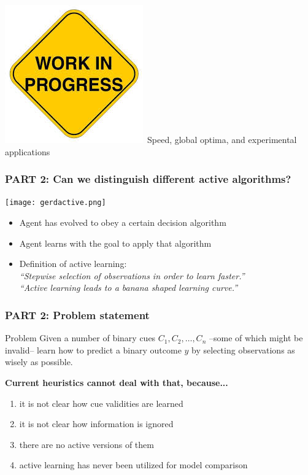 \documentclass{beamer}
\begin{document}
\begin{frame}
 \includegraphics[scale=0.12]{workinprogress.jpeg}~Speed, global optima, and experimental applications
\end{frame}


\begin{frame}
 \frametitle{PART 2: Can we distinguish different active algorithms?}
\vspace{-1cm}
\begin{center}
\texttt{[image: gerdactive.png]}
\end{center}
\begin{itemize}
\vspace{-0.5cm}
\item Agent has evolved to obey a certain decision algorithm
\item Agent learns with the goal to apply that algorithm 
\item Definition of active learning:\medskip\\
\emph{``Stepwise selection of observations in order to learn faster.''}\medskip\\
\emph{``Active learning leads to a banana shaped learning curve.''}
\end{itemize}
\end{frame}


\begin{frame}
 \frametitle{PART 2: Problem statement}
\begin{block}{Problem}
Given a number of binary cues $C_1, C_2, \dots, C_n$ --some of which might be invalid-- learn how to predict a binary outcome $y$ by selecting observations as wisely as possible.
\end{block}
\textbf{Current heuristics cannot deal with that, because...}
\begin{enumerate}
\item it is not clear how cue validities are learned
\item it is not clear how information is ignored
\item there are no active versions of them
\item active learning has never been utilized for model comparison
\end{enumerate}
\end{frame}
\end{document}
